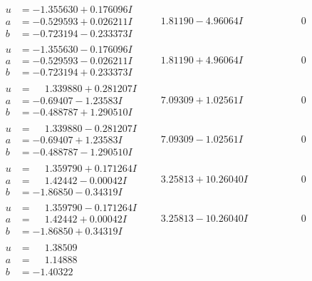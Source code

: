 \documentclass[1p]{elsarticle_modified}
\theoremstyle{definition}
\begin{document}
$$\begin{array}{c|c|c}
\begin{aligned}
u &= -1.355630 + 0.176096 I \\
a &= -0.529593 + 0.026211 I \\
b &= -0.723194 - 0.233373 I\end{aligned}
 & \phantom{-}1.81190 - 4.96064 I & \phantom{-0.000000 } 0 \\ \hline\begin{aligned}
u &= -1.355630 - 0.176096 I \\
a &= -0.529593 - 0.026211 I \\
b &= -0.723194 + 0.233373 I\end{aligned}
 & \phantom{-}1.81190 + 4.96064 I & \phantom{-0.000000 } 0 \\ \hline\begin{aligned}
u &= \phantom{-}1.339880 + 0.281207 I \\
a &= -0.69407 - 1.23583 I \\
b &= -0.488787 + 1.290510 I\end{aligned}
 & \phantom{-}7.09309 + 1.02561 I & \phantom{-0.000000 } 0 \\ \hline\begin{aligned}
u &= \phantom{-}1.339880 - 0.281207 I \\
a &= -0.69407 + 1.23583 I \\
b &= -0.488787 - 1.290510 I\end{aligned}
 & \phantom{-}7.09309 - 1.02561 I & \phantom{-0.000000 } 0 \\ \hline\begin{aligned}
u &= \phantom{-}1.359790 + 0.171264 I \\
a &= \phantom{-}1.42442 - 0.00042 I \\
b &= -1.86850 - 0.34319 I\end{aligned}
 & \phantom{-}3.25813 + 10.26040 I & \phantom{-0.000000 } 0 \\ \hline\begin{aligned}
u &= \phantom{-}1.359790 - 0.171264 I \\
a &= \phantom{-}1.42442 + 0.00042 I \\
b &= -1.86850 + 0.34319 I\end{aligned}
 & \phantom{-}3.25813 - 10.26040 I & \phantom{-0.000000 } 0 \\ \hline\begin{aligned}
u &= \phantom{-}1.38509\phantom{ +0.000000I} \\
a &= \phantom{-}1.14888\phantom{ +0.000000I} \\
b &= -1.40322\phantom{ +0.000000I}\end{aligned}

\end{array}$$
\end{document}
